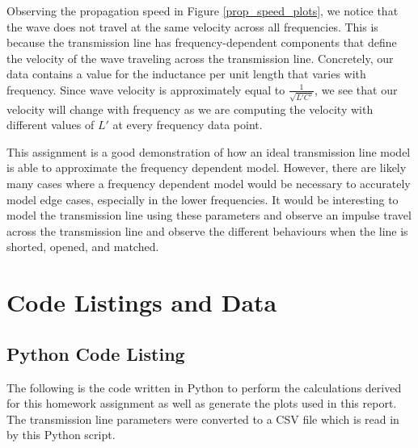 \documentclass[10pt, oneside, letterpaper]{article}
\begin{document}
Observing the propagation speed in Figure \ref{prop_speed_plots}, we notice that the wave does not travel at the same velocity across all frequencies. This is because the transmission line has frequency-dependent components that define the velocity of the wave traveling across the transmission line. Concretely, our data contains a value for the inductance per unit length that varies with frequency. Since wave velocity is approximately equal to $\frac{1}{\sqrt{L'C'}}$, we see that our velocity will change with frequency as we are computing the velocity with different values of $L'$ at every frequency data point.

This assignment is a good demonstration of how an ideal transmission line model is able to approximate the frequency dependent model. However, there are likely many cases where a frequency dependent model would be necessary to accurately model edge cases, especially in the lower frequencies. It would be interesting to model the transmission line using these parameters and observe an impulse travel across the transmission line and observe the different behaviours when the line is shorted, opened, and matched.

\newpage
\section{Code Listings and Data}

\subsection{Python Code Listing}
\label{code-listing-python}
The following is the code written in Python to perform the calculations derived for this homework assignment as well as generate the plots used in this report. The transmission line parameters were converted to a CSV file which is read in by this Python script.

\end{document}
